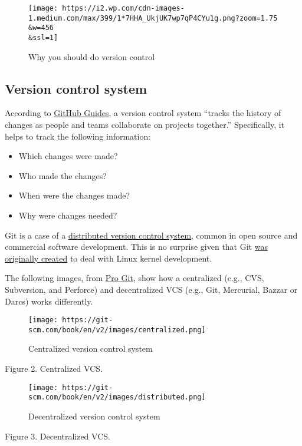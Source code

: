 \documentclass[
]{book}
\providecommand{\tightlist}{%
  \setlength{\itemsep}{0pt}\setlength{\parskip}{0pt}}
\begin{document}
\begin{figure}
\centering
\texttt{[image: https://i2.wp.com/cdn-images-1.medium.com/max/399/1*7HHA\_UkjUK7wp7qP4CYu1g.png?zoom=1.75\\\&w=456\\\&ssl=1]}
\caption{Why you should do version control}
\end{figure}

\hypertarget{version-control-system}{%
\subsection{Version control system}\label{version-control-system}}

According to \href{https://guides.GitHub.com}{GitHub Guides}, a version control system ``tracks the history of changes as people and teams collaborate on projects together.'' Specifically, it helps to track the following information:

\begin{itemize}
\tightlist
\item
  Which changes were made?
\item
  Who made the changes?
\item
  When were the changes made?
\item
  Why were changes needed?
\end{itemize}

Git is a case of a \href{https://en.wikipedia.org/wiki/Distributed_version_control}{distributed version control system}, common in open source and commercial software development. This is no surprise given that Git \href{https://lkml.org/lkml/2005/4/6/121}{was originally created} to deal with Linux kernel development.

The following images, from \href{git-scm.com}{Pro Git}, show how a centralized (e.g., CVS, Subversion, and Perforce) and decentralized VCS (e.g., Git, Mercurial, Bazzar or Darcs) works differently.

\begin{figure}
\centering
\texttt{[image: https://git-scm.com/book/en/v2/images/centralized.png]}
\caption{Centralized version control system}
\end{figure}

Figure 2. Centralized VCS.

\begin{figure}
\centering
\texttt{[image: https://git-scm.com/book/en/v2/images/distributed.png]}
\caption{Decentralized version control system}
\end{figure}

Figure 3. Decentralized VCS.
\end{document}
